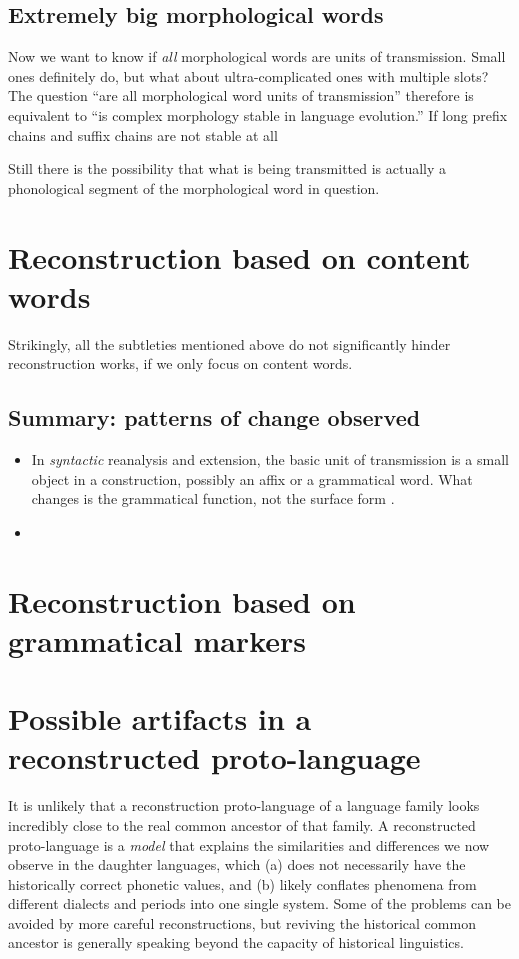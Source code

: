 \documentclass[a4paper, oneside, scheme=plain, 12pt]{article}
\begin{document}
\subsection{Extremely big morphological words}

Now we want to know if \emph{all} morphological words are units of transmission.
Small ones definitely do, but what about ultra-complicated ones with multiple slots?
The question ``are all morphological word units of transmission'' therefore is equivalent to 
``is complex morphology stable in language evolution.''
If long prefix chains and suffix chains are not stable at all

Still there is the possibility that what is being transmitted is actually
a phonological segment of the morphological word in question.

\section{Reconstruction based on content words}

Strikingly, all the subtleties mentioned above do not significantly hinder reconstruction works,
if we only focus on content words.

\subsection{Summary: patterns of change observed}

\begin{itemize}
    \item In \emph{syntactic} reanalysis and extension,
    the basic unit of transmission is a small object in a construction,
    possibly an affix or a grammatical word.
    What changes is the grammatical function, not the surface form .
    \item 
\end{itemize}

\section{Reconstruction based on grammatical markers}

\section{Possible artifacts in a reconstructed proto-language}

It is unlikely that a reconstruction proto-language of a language family
looks incredibly close to the real common ancestor of that family.
A reconstructed proto-language is a \emph{model} that explains
the similarities and differences we now observe in the daughter languages,
which (a) does not necessarily have the historically correct phonetic values,
and (b) likely conflates phenomena from different dialects and periods into one single system.
Some of the problems can be avoided by more careful reconstructions,
but reviving the historical common ancestor is generally speaking beyond the capacity of historical linguistics.
\end{document}
